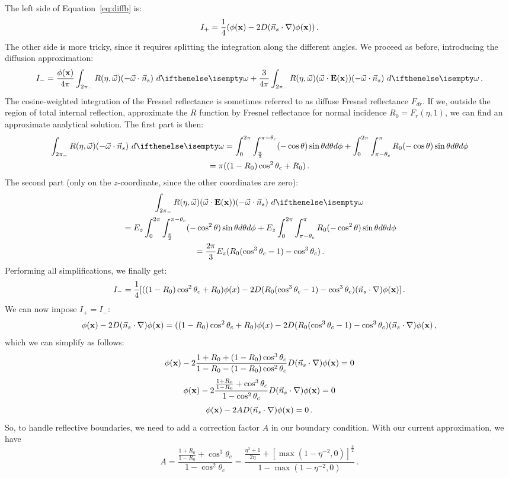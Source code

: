 \documentclass[10pt,a4paper]{article}
\begin{document}
The left side of Equation~\ref{eq:diffb} is:
$$
I_+ = \frac{1}{4}({\phi}(\mathbf{x}) - 2 D (\vec{n}_s \cdot {\nabla}) {\phi}(\mathbf{x})) \, .
$$
The other side is more tricky, since it requires splitting the integration along the different angles. We proceed as before, introducing the diffusion approximation:
$$
I_- = \frac{\xfunc{\phi}}{4\pi} \lowerhemisphere{ R(\eta, \omegavec) (-\omegavec \cdot \vec{n}_s)}{} + \frac{3}{4\pi} \lowerhemisphere{R(\eta, \omegavec)(\omegavec \cdot \xvecfunc{E}) (-\omegavec \cdot \vec{n}_s) }{} \, .
$$
The cosine-weighted integration of the Fresnel reflectance is sometimes referred to as diffuse Fresnel reflectance $F_{dr}$. If we, outside the region of total internal reflection, approximate the $R$ function by Fresnel reflectance for normal incidence $R_0 = F_r(\eta, 1)$, we can find an approximate analytical solution. The first part is then:
\begin{multline*}
\lowerhemisphere{ R(\eta, \omegavec) (-\omegavec \cdot \vec{n}_s)}{} = \int_{0}^{2\pi} \int_{\frac{\pi}{2}}^{\pi - \theta_c} (-\cos\theta) \sin\theta d\theta d\phi + \int_{0}^{2\pi} \int_{\pi - \theta_c}^{\pi} R_0 (-\cos\theta) \sin\theta d\theta d\phi \\ = \pi((1 - R_0)\cos^2\theta_c + R_0) \, .
\end{multline*}
The second part (only on the $z$-coordinate, since the other coordinates are zero):
\begin{multline*}
\lowerhemisphere{R(\eta, \omegavec)(\omegavec \cdot \xvecfunc{E}) (-\omegavec \cdot \vec{n}_s) }{}\\ {}=E_z \int_{0}^{2\pi} \int_{\frac{\pi}{2}}^{\pi - \theta_c} (-\cos^2\theta) \sin\theta d\theta d\phi + E_z \int_{0}^{2\pi}  \int_{\pi - \theta_c}^{\pi} R_0 (-\cos^2\theta) \sin\theta d\theta d\phi \\
{}=\frac{2\pi}{3} E_z (R_0 (\cos^3\theta_c - 1) - \cos^3\theta_c) \, .
\end{multline*}
Performing all simplifications, we finally get:
$$
I_- =  \frac{1}{4}[((1 - R_0)\cos^2\theta_c + R_0) \phi(x) - 2 D (R_0 (\cos^3\theta_c - 1) - \cos^3\theta_c) (\vec{n}_s \cdot {\nabla}) {\phi}(\mathbf{x})] \, .
$$
We can now impose $I_+ = I_-$:
$$
 {\phi}(\mathbf{x}) - 2 D (\vec{n}_s \cdot {\nabla}) {\phi}(\mathbf{x}) = ((1 - R_0)\cos^2\theta_c + R_0) \phi(x) - 2 D (R_0 (\cos^3\theta_c - 1) - \cos^3\theta_c) (\vec{n}_s \cdot {\nabla}) {\phi}(\mathbf{x}) \, ,
$$
which we can simplify as follows:
$$
  {\phi}(\mathbf{x}) - 2 \frac{1 + R_0 + (1 - R_0)\cos^3\theta_c}{1 - R_0 - (1 - R_0)\cos^2\theta_c} D (\vec{n}_s \cdot {\nabla}) {\phi}(\mathbf{x}) = 0
$$
$$
  {\phi}(\mathbf{x}) - 2 \frac{\frac{1 + R_0}{1 - R_0} + \cos^3\theta_c}{1 - \cos^2\theta_c} D (\vec{n}_s \cdot {\nabla}) {\phi}(\mathbf{x}) = 0
$$
$$
  {\phi}(\mathbf{x}) - 2 A D (\vec{n}_s \cdot {\nabla}) {\phi}(\mathbf{x}) = 0 \, .
$$
So, to handle reflective boundaries, we need to add a correction factor $A$ in our boundary condition. With our current approximation, we have
$$
A = \frac{\frac{1 + R_0}{1 - R_0} + \cos^3\theta_c}{1 - \cos^2\theta_c} = \frac{\frac{\eta^2 + 1}{2\eta} + [\max(1 - \eta^{-2}, 0)]^{\frac{3}{2}}}{1 - \max(1 - \eta^{-2}, 0)} \, .
$$
\end{document}
